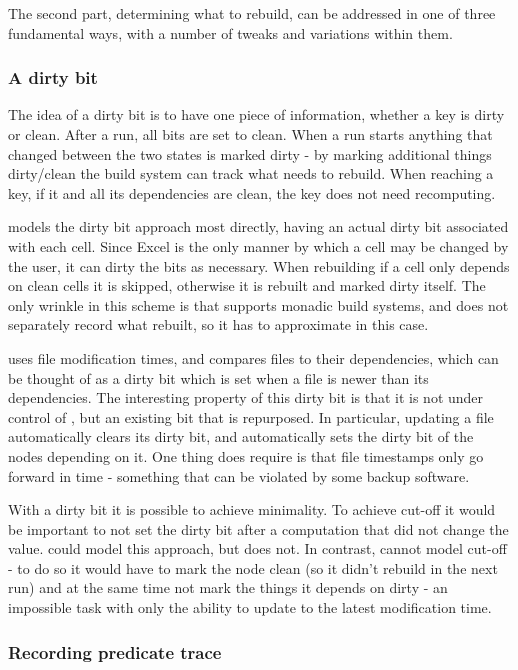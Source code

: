 The second part, determining what to rebuild, can be addressed in one of three fundamental ways, with a number of tweaks and variations within them.

\subsubsection{A dirty bit}

The idea of a dirty bit is to have one piece of information, whether a key is dirty or clean. After a run, all bits are set to clean. When a run starts anything that changed between the two states is marked dirty - by marking additional things dirty/clean the build system can track what needs to rebuild. When reaching a key, if it and all its dependencies are clean, the key does not need recomputing.

\Excel models the dirty bit approach most directly, having an actual dirty bit associated with each cell. Since Excel is the only manner by which a cell may be changed by the user, it can dirty the bits as necessary. When rebuilding if a cell only depends on clean cells it is skipped, otherwise it is rebuilt and marked dirty itself. The only wrinkle in this scheme is that \Excel supports monadic build systems, and does not separately record what rebuilt, so it has to approximate in this case.

\Make uses file modification times, and compares files to their dependencies, which can be thought of as a dirty bit which is set when a file is newer than its dependencies. The interesting property of this dirty bit is that it is not under control of \Make, but an existing bit that is repurposed. In particular, updating a file automatically clears its dirty bit, and automatically sets the dirty bit of the nodes depending on it. One thing \Make does require is that file timestamps only go forward in time - something that can be violated by some backup software.

With a dirty bit it is possible to achieve minimality. To achieve cut-off it would be important to not set the dirty bit after a computation that did not change the value. \Excel could model this approach, but does not. In contrast, \Make cannot model cut-off - to do so it would have to mark the node clean (so it didn't rebuild in the next run) and at the same time not mark the things it depends on dirty - an impossible task with only the ability to update to the latest modification time.

\subsubsection{Recording predicate trace}

